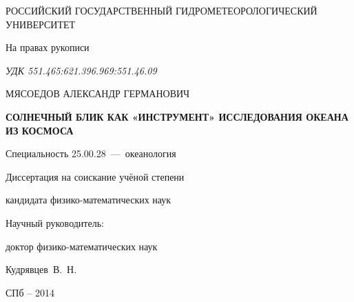 \thispagestyle{empty}

\begin{center}
РОССИЙСКИЙ ГОСУДАРСТВЕННЫЙ ГИДРОМЕТЕОРОЛОГИЧЕСКИЙ УНИВЕРСИТЕТ\par
\par 
\par
\end{center}

\vspace{20mm}
\begin{flushright}
На правах рукописи

{\sl УДК 551.465:621.396.969:551.46.09}

\end{flushright}

\vspace{30mm}
\begin{center}
{\large МЯСОЕДОВ АЛЕКСАНДР ГЕРМАНОВИЧ}
\end{center}

\vspace{5mm}
\begin{center}
{\bf \large СОЛНЕЧНЫЙ БЛИК КАК «ИНСТРУМЕНТ» ИССЛЕДОВАНИЯ ОКЕАНА ИЗ КОСМОСА
\par}

\vspace{10mm}
{%
Специальность 25.00.28~---~океанология
}

\vspace{10mm}
Диссертация на соискание учёной степени

кандидата физико-математических наук
\end{center}

\vspace{20mm}
\begin{flushright}
Научный руководитель:

доктор физико-математических наук

Кудрявцев~В.~Н.

\end{flushright}

\vspace{20mm}
\begin{center}
{СПб -- 2014}
\end{center}

\newpage